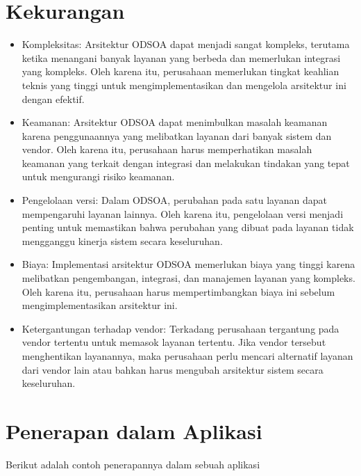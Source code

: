 \section{Kekurangan}
\begin{itemize}
\item Kompleksitas: Arsitektur ODSOA dapat menjadi sangat kompleks, terutama ketika menangani banyak layanan yang berbeda dan memerlukan integrasi yang kompleks. Oleh karena itu, perusahaan memerlukan tingkat keahlian teknis yang tinggi untuk mengimplementasikan dan mengelola arsitektur ini dengan efektif.
\item Keamanan: Arsitektur ODSOA dapat menimbulkan masalah keamanan karena penggunaannya yang melibatkan layanan dari banyak sistem dan vendor. Oleh karena itu, perusahaan harus memperhatikan masalah keamanan yang terkait dengan integrasi dan melakukan tindakan yang tepat untuk mengurangi risiko keamanan.
\item Pengelolaan versi: Dalam ODSOA, perubahan pada satu layanan dapat mempengaruhi layanan lainnya. Oleh karena itu, pengelolaan versi menjadi penting untuk memastikan bahwa perubahan yang dibuat pada layanan tidak mengganggu kinerja sistem secara keseluruhan.
\item Biaya: Implementasi arsitektur ODSOA memerlukan biaya yang tinggi karena melibatkan pengembangan, integrasi, dan manajemen layanan yang kompleks. Oleh karena itu, perusahaan harus mempertimbangkan biaya ini sebelum mengimplementasikan arsitektur ini.
\item Ketergantungan terhadap vendor: Terkadang perusahaan tergantung pada vendor tertentu untuk memasok layanan tertentu. Jika vendor tersebut menghentikan layanannya, maka perusahaan perlu mencari alternatif layanan dari vendor lain atau bahkan harus mengubah arsitektur sistem secara keseluruhan.
\end{itemize}

\section{Penerapan dalam Aplikasi}
Berikut adalah contoh penerapannya dalam sebuah aplikasi
